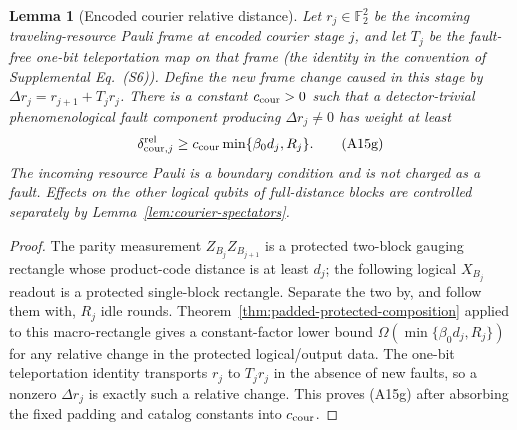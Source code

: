 \documentclass[aps,prx,reprint,superscriptaddress,nofootinbib,floatfix,longbibliography]{revtex4-2}
\newtheorem{lemma}[theorem]{Lemma}
\theoremstyle{definition}
\begin{document}
\begin{lemma}[Encoded courier relative distance]\label{lem:encoded-courier-distance}
Let $r_j\in\mathbb F_2^2$ be the incoming traveling-resource Pauli frame at
encoded courier stage $j$, and let $T_j$ be the fault-free one-bit
teleportation map on that frame (the identity in the convention of
Supplemental Eq.~(S6)).  Define the new frame change caused in this stage by
$\Delta r_j=r_{j+1}+T_jr_j$.  There is a constant $c_{\rm cour}>0$ such that a
detector-trivial phenomenological fault component producing
$\Delta r_j\neq0$ has weight at
least
\begin{equation}
 \delta_{{\rm cour},j}^{\rm rel}
 \geq c_{\rm cour}\min\{\beta_0d_j,R_j\}.                         \tag{A15g}
\end{equation}
The incoming resource Pauli is a boundary condition and is not charged as a
fault.  Effects on the other logical qubits of full-distance blocks are
controlled separately by Lemma~\ref{lem:courier-spectators}.
\end{lemma}
\begin{proof}
The parity measurement $Z_{B_j}Z_{B_{j+1}}$ is a protected two-block gauging
rectangle whose product-code distance is at least $d_j$; the following
logical $X_{B_j}$ readout is a protected single-block rectangle.  Separate the
two by, and follow them with, $R_j$ idle rounds.  Theorem~\ref{thm:padded-protected-composition}
applied to this macro-rectangle gives a constant-factor lower bound
$\Omega(\min\{\beta_0d_j,R_j\})$ for any relative change in the protected
logical/output data.  The one-bit teleportation identity transports
$r_j$ to $T_jr_j$ in the absence of new faults, so a nonzero $\Delta r_j$ is
exactly such a relative change.  This proves (A15g) after absorbing the fixed
padding and catalog constants into $c_{\rm cour}$.
\end{proof}
\end{document}
